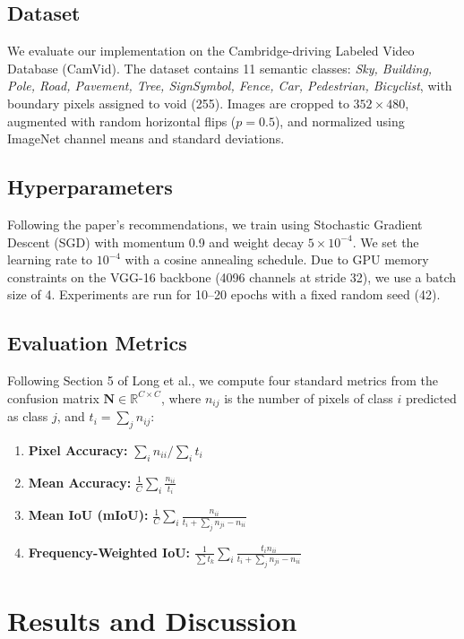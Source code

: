 \documentclass[conference]{IEEEtran}
\begin{document}
\subsection{Dataset}
We evaluate our implementation on the Cambridge-driving Labeled Video Database (CamVid). The dataset contains 11 semantic classes: \textit{Sky, Building, Pole, Road, Pavement, Tree, SignSymbol, Fence, Car, Pedestrian, Bicyclist}, with boundary pixels assigned to void (255). Images are cropped to $352 \times 480$, augmented with random horizontal flips ($p = 0.5$), and normalized using ImageNet channel means and standard deviations.

\subsection{Hyperparameters}
Following the paper's recommendations, we train using Stochastic Gradient Descent (SGD) with momentum 0.9 and weight decay $5 \times 10^{-4}$. We set the learning rate to $10^{-4}$ with a cosine annealing schedule. Due to GPU memory constraints on the VGG-16 backbone (4096 channels at stride 32), we use a batch size of 4. Experiments are run for 10–20 epochs with a fixed random seed (42).

\subsection{Evaluation Metrics}
Following Section 5 of Long et al., we compute four standard metrics from the confusion matrix $\mathbf{N} \in \mathbb{R}^{C \times C}$, where $n_{ij}$ is the number of pixels of class $i$ predicted as class $j$, and $t_i = \sum_j n_{ij}$:
\begin{enumerate}
    \item \textbf{Pixel Accuracy:} $\sum_i n_{ii} / \sum_i t_i$
    \item \textbf{Mean Accuracy:} $\frac{1}{C} \sum_i \frac{n_{ii}}{t_i}$
    \item \textbf{Mean IoU (mIoU):} $\frac{1}{C} \sum_i \frac{n_{ii}}{t_i + \sum_j n_{ji} - n_{ii}}$
    \item \textbf{Frequency-Weighted IoU:} $\frac{1}{\sum t_k} \sum_i \frac{t_i n_{ii}}{t_i + \sum_j n_{ji} - n_{ii}}$
\end{enumerate}

\section{Results and Discussion}
\end{document}

